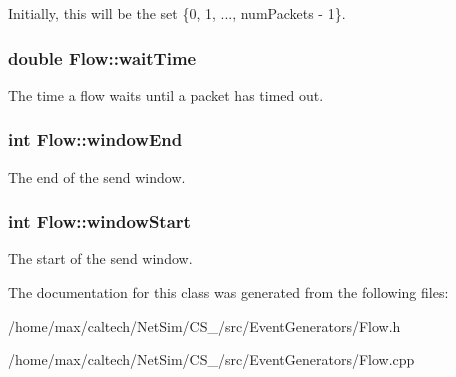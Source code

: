 \-Initially, this will be the set \{0, 1, ..., num\-Packets -\/ 1\}. \hypertarget{classFlow_a47968d3d4596ad50ce090a0c352a89f5}{
\subsubsection[{wait\-Time}]{\setlength{\rightskip}{0pt plus 5cm}double {\bf \-Flow\-::wait\-Time}}}\label{classFlow_a47968d3d4596ad50ce090a0c352a89f5}


\-The time a flow waits until a packet has timed out. 

\hypertarget{classFlow_a8ffd0d6dd0bf1c2c2b97ac164890715f}{
\subsubsection[{window\-End}]{\setlength{\rightskip}{0pt plus 5cm}int {\bf \-Flow\-::window\-End}}}\label{classFlow_a8ffd0d6dd0bf1c2c2b97ac164890715f}


\-The end of the send window. 

\hypertarget{classFlow_a1c04de60a81b02750673806906701a76}{
\subsubsection[{window\-Start}]{\setlength{\rightskip}{0pt plus 5cm}int {\bf \-Flow\-::window\-Start}}}\label{classFlow_a1c04de60a81b02750673806906701a76}


\-The start of the send window. 



\-The documentation for this class was generated from the following files\-:\begin{DoxyCompactItemize}
\item 
/home/max/caltech/\-Net\-Sim/\-C\-S\-\_/src/\-Event\-Generators/\-Flow.\-h\item 
/home/max/caltech/\-Net\-Sim/\-C\-S\-\_/src/\-Event\-Generators/\-Flow.\-cpp\end{DoxyCompactItemize}
